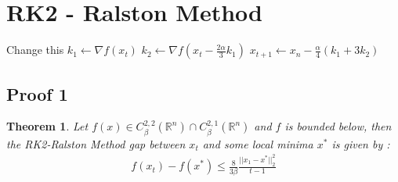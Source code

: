\documentclass[12pt,twoside]{article}
\newtheorem{thm}{Theorem}
\begin{document}
\section{RK2 - Ralston Method}

\begin{algorithmic}
\STATE Change this
	\STATE $k_1 \gets \nabla f(x_t)$
	\STATE $k_2 \gets \nabla f(x_t - \frac{2\alpha}{3} k_1) $
	\STATE $x_{t+1} \gets x_n - \frac{\alpha}{4}(k_1 + 3 k_2)$
\ENDFOR
\end{algorithmic}

\subsection{Proof 1}
\begin{thm} Let $f(x) \in C_{\beta}^{2,2}( \mathbb{R}^n) \cap  C_{\beta}^{2,1}( \mathbb{R}^n)$ and $f$ is bounded below, then the RK2-Ralston Method gap between $x_t$ and some local minima $x^*$ is given by :
\begin{align*}
f(x_t) - f(x^*) \leq \frac{8}{3 \beta} \frac{ || x_1 - x^* ||_2^2}{t-1}
\end{align*}
\end{thm}
\end{document}
